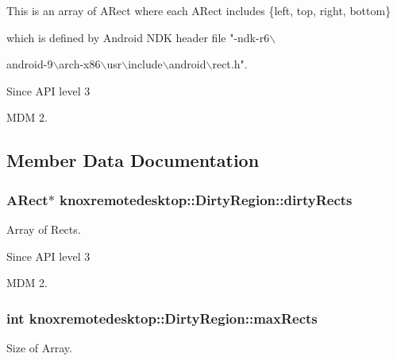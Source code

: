 \-This is an array of \-A\-Rect where each \-A\-Rect includes \{left, top, right, bottom\}

which is defined by \-Android \-N\-D\-K header file "-\/ndk-\/r6$\backslash$

android-\/9$\backslash$arch-\/x86$\backslash$usr$\backslash$include$\backslash$android$\backslash$rect.\-h".

\begin{DoxySince}{\-Since}
\-A\-P\-I level 3

\-M\-D\-M 2. 
\end{DoxySince}


\subsection{\-Member \-Data \-Documentation}
\hypertarget{classknoxremotedesktop_1_1DirtyRegion_a46d58ad2c718f79613f9ad1b02d64c3d}{
\subsubsection[{dirty\-Rects}]{\setlength{\rightskip}{0pt plus 5cm}\-A\-Rect$\ast$ {\bf knoxremotedesktop\-::\-Dirty\-Region\-::dirty\-Rects}}}\label{classknoxremotedesktop_1_1DirtyRegion_a46d58ad2c718f79613f9ad1b02d64c3d}


\-Array of \-Rects. 

\begin{DoxySince}{\-Since}
\-A\-P\-I level 3

\-M\-D\-M 2. 
\end{DoxySince}
\hypertarget{classknoxremotedesktop_1_1DirtyRegion_a65b638db44b5b39191e0d72123d9ccc8}{
\subsubsection[{max\-Rects}]{\setlength{\rightskip}{0pt plus 5cm}int {\bf knoxremotedesktop\-::\-Dirty\-Region\-::max\-Rects}}}\label{classknoxremotedesktop_1_1DirtyRegion_a65b638db44b5b39191e0d72123d9ccc8}


\-Size of \-Array. 


